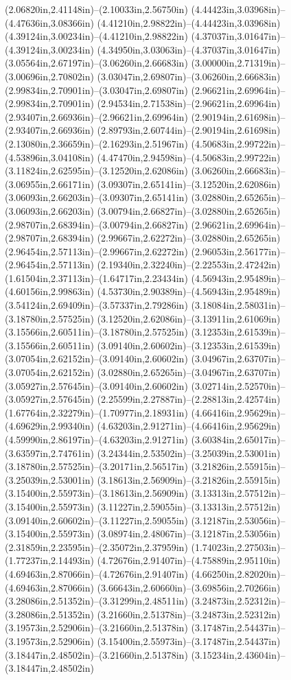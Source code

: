 (2.06820in,2.41148in)--(2.10033in,2.56750in) (4.44423in,3.03968in)--(4.47636in,3.08366in) (4.41210in,2.98822in)--(4.44423in,3.03968in) (4.39124in,3.00234in)--(4.41210in,2.98822in) (4.37037in,3.01647in)--(4.39124in,3.00234in) (4.34950in,3.03063in)--(4.37037in,3.01647in) (3.05564in,2.67197in)--(3.06260in,2.66683in) (3.00000in,2.71319in)--(3.00696in,2.70802in) (3.03047in,2.69807in)--(3.06260in,2.66683in) (2.99834in,2.70901in)--(3.03047in,2.69807in) (2.96621in,2.69964in)--(2.99834in,2.70901in) (2.94534in,2.71538in)--(2.96621in,2.69964in) (2.93407in,2.66936in)--(2.96621in,2.69964in) (2.90194in,2.61698in)--(2.93407in,2.66936in) (2.89793in,2.60744in)--(2.90194in,2.61698in) (2.13080in,2.36659in)--(2.16293in,2.51967in) (4.50683in,2.99722in)--(4.53896in,3.04108in) (4.47470in,2.94598in)--(4.50683in,2.99722in) (3.11824in,2.62595in)--(3.12520in,2.62086in) (3.06260in,2.66683in)--(3.06955in,2.66171in) (3.09307in,2.65141in)--(3.12520in,2.62086in) (3.06093in,2.66203in)--(3.09307in,2.65141in) (3.02880in,2.65265in)--(3.06093in,2.66203in) (3.00794in,2.66827in)--(3.02880in,2.65265in) (2.98707in,2.68394in)--(3.00794in,2.66827in) (2.96621in,2.69964in)--(2.98707in,2.68394in) (2.99667in,2.62272in)--(3.02880in,2.65265in) (2.96454in,2.57113in)--(2.99667in,2.62272in) (2.96053in,2.56177in)--(2.96454in,2.57113in) (2.19340in,2.32240in)--(2.22553in,2.47242in) (1.61504in,2.37113in)--(1.64717in,2.23434in) (4.56943in,2.95489in)--(4.60156in,2.99863in) (4.53730in,2.90389in)--(4.56943in,2.95489in) (3.54124in,2.69409in)--(3.57337in,2.79286in) (3.18084in,2.58031in)--(3.18780in,2.57525in) (3.12520in,2.62086in)--(3.13911in,2.61069in) (3.15566in,2.60511in)--(3.18780in,2.57525in) (3.12353in,2.61539in)--(3.15566in,2.60511in) (3.09140in,2.60602in)--(3.12353in,2.61539in) (3.07054in,2.62152in)--(3.09140in,2.60602in) (3.04967in,2.63707in)--(3.07054in,2.62152in) (3.02880in,2.65265in)--(3.04967in,2.63707in) (3.05927in,2.57645in)--(3.09140in,2.60602in) (3.02714in,2.52570in)--(3.05927in,2.57645in) (2.25599in,2.27887in)--(2.28813in,2.42574in) (1.67764in,2.32279in)--(1.70977in,2.18931in) (4.66416in,2.95629in)--(4.69629in,2.99340in) (4.63203in,2.91271in)--(4.66416in,2.95629in) (4.59990in,2.86197in)--(4.63203in,2.91271in) (3.60384in,2.65017in)--(3.63597in,2.74761in) (3.24344in,2.53502in)--(3.25039in,2.53001in) (3.18780in,2.57525in)--(3.20171in,2.56517in) (3.21826in,2.55915in)--(3.25039in,2.53001in) (3.18613in,2.56909in)--(3.21826in,2.55915in) (3.15400in,2.55973in)--(3.18613in,2.56909in) (3.13313in,2.57512in)--(3.15400in,2.55973in) (3.11227in,2.59055in)--(3.13313in,2.57512in) (3.09140in,2.60602in)--(3.11227in,2.59055in) (3.12187in,2.53056in)--(3.15400in,2.55973in) (3.08974in,2.48067in)--(3.12187in,2.53056in) (2.31859in,2.23595in)--(2.35072in,2.37959in) (1.74023in,2.27503in)--(1.77237in,2.14493in) (4.72676in,2.91407in)--(4.75889in,2.95110in) (4.69463in,2.87066in)--(4.72676in,2.91407in) (4.66250in,2.82020in)--(4.69463in,2.87066in) (3.66643in,2.60660in)--(3.69856in,2.70266in) (3.28086in,2.51352in)--(3.31299in,2.48511in) (3.24873in,2.52312in)--(3.28086in,2.51352in) (3.21660in,2.51378in)--(3.24873in,2.52312in) (3.19573in,2.52906in)--(3.21660in,2.51378in) (3.17487in,2.54437in)--(3.19573in,2.52906in) (3.15400in,2.55973in)--(3.17487in,2.54437in) (3.18447in,2.48502in)--(3.21660in,2.51378in) (3.15234in,2.43604in)--(3.18447in,2.48502in) 